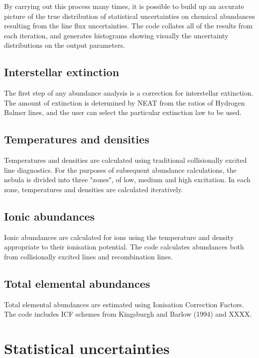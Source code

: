 \documentclass[]{../MNtemplate/mn2e}
\begin{document}
By carrying out this process many times, it is possible to build up an accurate picture of the true distribution of statistical uncertainties on chemical abundances resulting from the line flux uncertainties.  The code collates all of the results from each iteration, and generates histograms showing visually the uncertainty distributions on the output parameters.

\subsection{Interstellar extinction}

The first step of any abundance analysis is a correction for interstellar extinction.  The amount of extinction is determined by NEAT from the ratios of Hydrogen Balmer lines, and the user can select the particular extinction law to be used.

\subsection{Temperatures and densities}

Temperatures and densities are calculated using traditional collisionally excited line diagnostics.  For the purposes of subsequent abundance calculations, the nebula is divided into three "zones", of low, medium and high excitation.  In each zone, temperatures and densities are calculated iteratively.

\subsection{Ionic abundances}

Ionic abundances are calculated for ions using the temperature and density appropriate to their ionisation potential.  The code calculates abundances both from collisionally excited lines and recombination lines.

\subsection{Total elemental abundances}

Total elemental abundances are estimated using Ionisation Correction Factors.  The code includes ICF schemes from Kingsburgh and Barlow (1994) and XXXX.

\section{Statistical uncertainties}
\end{document}
